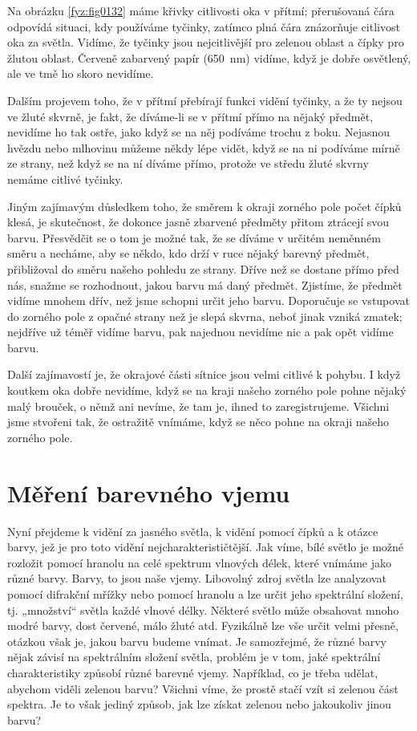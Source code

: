     Na obrázku \ref{fyz:fig0132} máme křivky citlivosti oka v přítmí; přerušovaná čára odpovídá 
    situaci, kdy používáme tyčinky, zatímco plná čára znázorňuje citlivost oka za světla. Vidíme, 
    že tyčinky jsou nejcitlivější pro zelenou oblast a čípky pro žlutou oblast. Červeně zabarvený 
    papír (\qty{650}{\nm}) vidíme, když je dobře osvětlený, ale ve tmě ho skoro nevidíme.
    
    Dalším projevem toho, že v přítmí přebírají funkci vidění tyčinky, a že ty nejsou ve žluté 
    skvrně, je fakt, že díváme-li se v přítmí přímo na nějaký předmět, nevidíme ho tak ostře, jako 
    když se na něj podíváme trochu z boku. Nejasnou hvězdu nebo mlhovinu můžeme někdy lépe vidět, 
    když se na ni podíváme mírně ze strany, než když se na ní díváme přímo, protože ve středu žluté 
    skvrny nemáme citlivé tyčinky.
    
    Jiným zajímavým důsledkem toho, že směrem k okraji zorného pole počet čípků klesá, je 
    skutečnost, že dokonce jasně zbarvené předměty přitom ztrácejí svou barvu. Přesvědčit se o tom 
    je možné tak, že se díváme v určitém neměnném směru a necháme, aby se někdo, kdo drží v ruce 
    nějaký barevný předmět, přibližoval do směru našeho pohledu ze strany. Dříve než se dostane 
    přímo před nás, snažme se rozhodnout, jakou barvu má daný předmět. Zjistíme, že předmět vidíme 
    mnohem dřív, než jsme schopni určit jeho barvu. Doporučuje se vstupovat do zorného pole z 
    opačné strany než je slepá skvrna, neboť jinak vzniká zmatek; nejdříve už téměř vidíme barvu, 
    pak najednou nevidíme nic a pak opět vidíme barvu.
    
    Další zajímavostí je, že okrajové části sítnice jsou velmi citlivé k pohybu. I když koutkem oka 
    dobře nevidíme, když se na kraji našeho zorného pole pohne nějaký malý brouček, o němž ani 
    nevíme, že tam je, ihned to zaregistrujeme. Všichni jsme stvořeni tak, že ostražitě vnímáme, 
    když se něco pohne na okraji našeho zorného pole.
    
  \section{Měření barevného vjemu}\label{fyz:IchapXXXVsecIII}
    Nyní přejdeme k vidění za jasného světla, k vidění pomocí čípků a k otázce barvy, jež je pro 
    toto vidění nejcharakterističtější. Jak víme, bílé světlo je možné rozložit pomocí hranolu na 
    celé spektrum vlnových délek, které vnímáme jako různé barvy. Barvy, to jsou naše vjemy. 
    Libovolný zdroj světla lze analyzovat pomocí difrakční mřížky nebo pomocí hranolu a lze určit 
    jeho spektrální složení, tj. „množství“ světla každé vlnové délky. Některé světlo může 
    obsahovat mnoho modré barvy, dost červené, málo žluté atd. Fyzikálně lze vše určit velmi 
    přesně, otázkou však je, jakou barvu budeme vnímat. Je samozřejmé, že různé barvy nějak závisí 
    na spektrálním složení světla, problém je v tom, jaké spektrální charakteristiky způsobí různé 
    barevné vjemy. Například, co je třeba udělat, abychom viděli zelenou barvu? Všichni víme, že 
    prostě stačí vzít si zelenou část spektra. Je to však jediný způsob, jak lze získat zelenou 
    nebo jakoukoliv jinou barvu?
    
